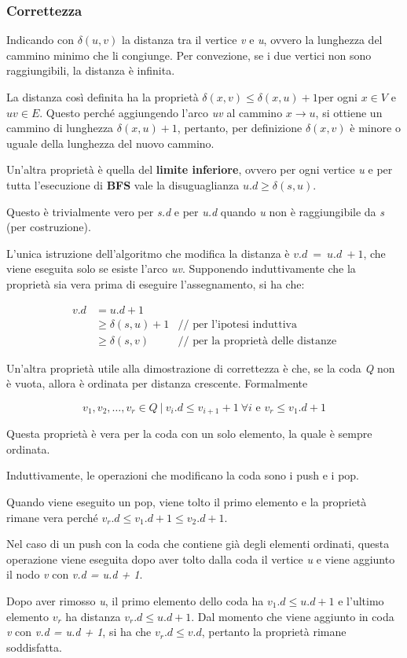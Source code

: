 \subsubsection{Correttezza}\label{correttezza}

Indicando con $\delta(u,v)$ la distanza tra il vertice \emph{v} e
\emph{u}, ovvero la lunghezza del cammino minimo che li congiunge. Per
convezione, se i due vertici non sono raggiungibili, la distanza è
infinita.

La distanza così definita ha la proprietà $\delta(x,v) \leq \delta(x,u) + 1$per ogni $x \in V$ e $uv \in E$. 
Questo perché aggiungendo l'arco \emph{uv} al cammino $ x \rightarrow u$, si ottiene un cammino di
lunghezza $\delta(x,u) + 1$, pertanto, per definizione $\delta(x,v)$ è
minore o uguale della lunghezza del nuovo cammino.

Un'altra proprietà è quella del \textbf{limite inferiore}, ovvero per
ogni vertice \emph{u} e per tutta l'esecuzione di \textbf{BFS} vale la
disuguaglianza $u.d \geq \delta(s,u)$.

Questo è trivialmente vero per \emph{s.d} e per \emph{u.d} quando \emph{u} non è raggiungibile da \emph{s} (per costruzione).

L'unica istruzione dell'algoritmo che modifica la distanza è
$v.d\ =\ u.d\ + 1$, che viene eseguita solo se esiste l'arco
\emph{uv}. Supponendo induttivamente che la proprietà sia vera prima di
eseguire l'assegnamento, si ha che:

\begin{align*}
v.d &= u.d + 1 &\\
     &\geq \delta(s,u) + 1 & \text{// per l'ipotesi induttiva }\\
     &\geq \delta(s,v)   & \text{// per la proprietà delle distanze}
\end{align*}

Un'altra proprietà utile alla dimostrazione di correttezza è che, se la
coda \emph{Q} non è vuota, allora è ordinata per distanza crescente.
Formalmente

$$
v_1, v_2, \ldots, v_r \in Q \: | \:  v_i.d \leq v_{i+1} + 1 \: \forall i  \text{ e } v_r \leq v_1.d +1
$$

Questa proprietà è vera per la coda con un solo elemento, la quale è
sempre ordinata.

Induttivamente, le operazioni che modificano la coda sono i push e i
pop.

Quando viene eseguito un pop, viene tolto il primo elemento e la
proprietà rimane vera perché $v_r.d \leq v_1.d + 1 \leq v_2.d + 1$.

Nel caso di un push con la coda che contiene già degli elementi
ordinati, questa operazione viene eseguita dopo aver tolto dalla coda il
vertice \emph{u} e viene aggiunto il nodo \emph{v} con \emph{v.d = u.d +
1}.

Dopo aver rimosso \emph{u}, il primo elemento dello coda ha  $v_1.d \leq u.d + 1$ e l'ultimo elemento $v_r$ ha distanza
$v_r.d \leq u.d +1$. Dal momento che viene aggiunto in
coda \emph{v} con \emph{v.d = u.d + 1}, si ha che $v_r.d \leq v.d$, pertanto la proprietà rimane soddisfatta.
